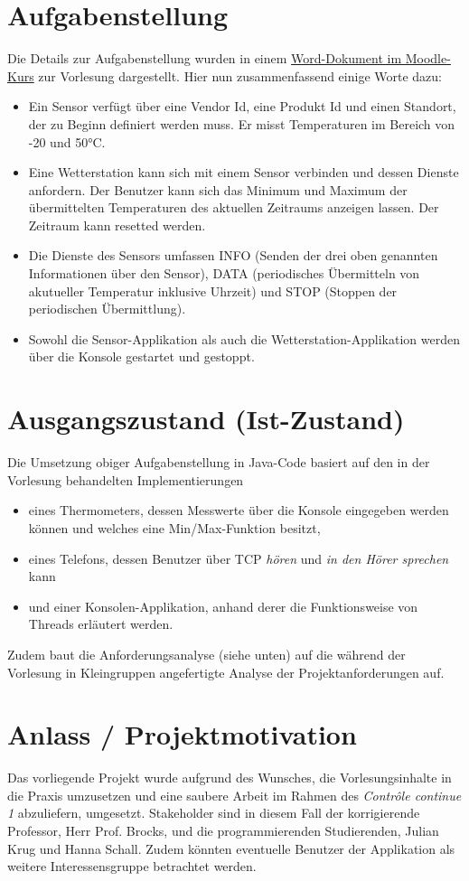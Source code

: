 \documentclass[a4paper]{report}
\begin{document}
\section{Aufgabenstellung}
Die Details zur Aufgabenstellung wurden in einem \href{https://moodle.htwsaar.de/mod/resource/view.php?id=58719}{Word-Dokument
im Moodle-Kurs} zur Vorlesung dargestellt.
Hier nun zusammenfassend einige Worte dazu:
\begin{itemize}
    \item Ein Sensor verfügt über eine Vendor Id, eine Produkt Id und einen Standort, der zu Beginn definiert werden muss. Er misst 
            Temperaturen im Bereich von -20 und 50°C. 
    \item Eine Wetterstation kann sich mit einem Sensor verbinden und dessen Dienste anfordern. Der Benutzer kann sich das Minimum und
            Maximum der übermittelten Temperaturen des aktuellen Zeitraums anzeigen lassen. Der Zeitraum kann resetted werden.
    \item Die Dienste des Sensors umfassen INFO (Senden der drei oben genannten Informationen über den Sensor), DATA (periodisches 
            Übermitteln von akutueller Temperatur inklusive Uhrzeit) und STOP (Stoppen der periodischen Übermittlung).
    \item Sowohl die Sensor-Applikation als auch die Wetterstation-Applikation werden über die Konsole gestartet und gestoppt.
\end{itemize}
\section{Ausgangszustand (Ist-Zustand)}
Die Umsetzung obiger Aufgabenstellung in Java-Code basiert auf den in der Vorlesung behandelten Implementierungen
\begin{itemize}
    \item eines Thermometers, dessen Messwerte über die Konsole eingegeben werden können und welches eine Min/Max-Funktion besitzt,
    \item eines Telefons, dessen Benutzer über TCP \textit{hören} und \textit{in den Hörer sprechen} kann
    \item und einer Konsolen-Applikation, anhand derer die Funktionsweise von Threads erläutert werden.
\end{itemize}
Zudem baut die Anforderungsanalyse (siehe unten) auf die während der Vorlesung in Kleingruppen angefertigte Analyse der 
Projektanforderungen auf.
\section{Anlass / Projektmotivation}
Das vorliegende Projekt wurde aufgrund des Wunsches, die Vorlesungsinhalte in die Praxis umzusetzen und eine saubere Arbeit im
Rahmen des \textit{Contrôle continue 1} abzuliefern, umgesetzt. Stakeholder sind in diesem Fall der korrigierende Professor, Herr Prof.
Brocks, und die programmierenden Studierenden, Julian Krug und Hanna Schall. Zudem könnten eventuelle Benutzer der Applikation als
weitere Interessensgruppe betrachtet werden.
\end{document}
